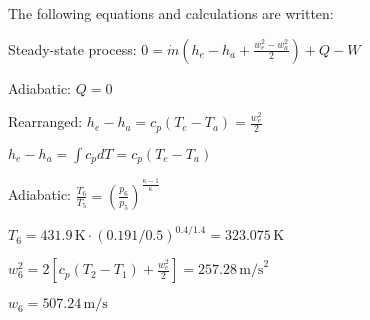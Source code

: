 The following equations and calculations are written:  

Steady-state process:  
\( 0 = \dot{m} (h_e - h_a + \frac{w_e^2 - w_a^2}{2}) + Q - W \)  

Adiabatic:  
\( Q = 0 \)  

Rearranged:  
\( h_e - h_a = c_p (T_e - T_a) = \frac{w_e^2}{2} \)  

\( h_e - h_a = \int c_p dT = c_p (T_e - T_a) \)  

Adiabatic:  
\( \frac{T_6}{T_5} = (\frac{p_6}{p_5})^{\frac{\kappa - 1}{\kappa}} \)  

\( T_6 = 431.9 \, \text{K} \cdot (0.191 / 0.5)^{0.4 / 1.4} = 323.075 \, \text{K} \)  

\( w_6^2 = 2 [c_p (T_2 - T_1) + \frac{w_e^2}{2}] = 257.28 \, \text{m/s}^2 \)  

\( w_6 = 507.24 \, \text{m/s} \)